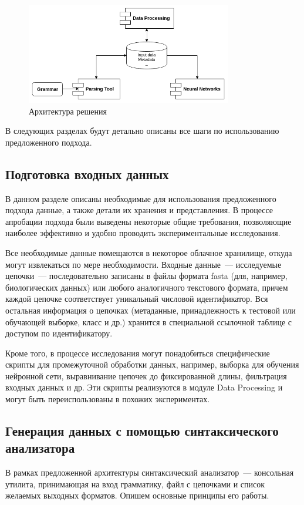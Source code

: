 \begin{figure}[h]
\begin{center}
\centering
\includegraphics[width=0.8\textwidth]{Lunina/pics/arch.png}
\caption{Архитектура решения}
\label{arch}
\end{center}
\end{figure}

В следующих разделах будут детально описаны все шаги по использованию предложенного подхода.

\subsection{Подготовка входных данных}

В данном разделе описаны необходимые для использования
предложенного подхода данные, а также детали их хранения и представления. В процессе апробации подхода были выведены некоторые общие требования, позволяющие наиболее эффективно и удобно проводить экспериментальные исследования.

Все необходимые данные помещаются в некоторое облачное хранилище, откуда могут извлекаться по мере необходимости. Входные данные~--- исследуемые цепочки~--- последовательно записаны в файлы формата fasta (для, например, биологических данных) или любого аналогичного текстового формата, причем каждой цепочке соответствует уникальный числовой идентификатор. Вся остальная информация о цепочках (метаданные, принадлежность к тестовой или обучающей выборке, класс и др.) хранится в специальной ссылочной таблице с доступом по идентификатору.

Кроме того, в процессе исследования могут понадобиться специфические скрипты для промежуточной обработки данных, например, выборка для обучения нейронной сети, выравнивание цепочек до фиксированной длины, фильтрация входных данных и др. Эти скрипты реализуются в модуле Data Processing и могут быть переиспользованы в похожих экспериментах.

\subsection{Генерация данных с помощью синтаксического анализатора}
В рамках предложенной архитектуры синтаксический анализатор~--- консольная утилита, принимающая на вход грамматику, файл с цепочками и список желаемых выходных форматов. Опишем основные принципы его работы.

